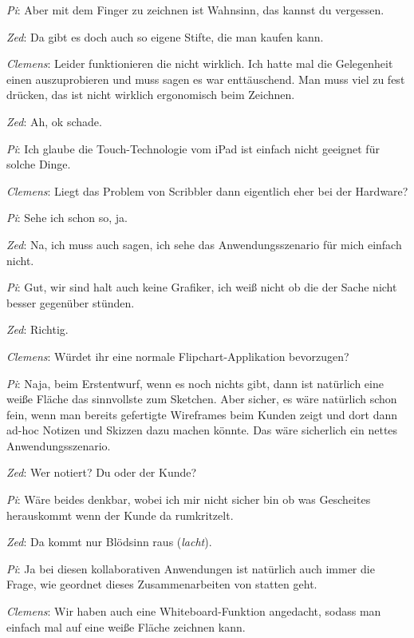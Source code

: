 \medskip \emph{Pi}: Aber mit dem Finger zu zeichnen ist Wahnsinn, das kannst du vergessen.

\medskip \emph{Zed}: Da gibt es doch auch so eigene Stifte, die man kaufen kann.

\medskip \emph{Clemens}: Leider funktionieren die nicht wirklich. Ich hatte mal die Gelegenheit einen auszuprobieren und muss sagen es war enttäuschend. Man muss viel zu fest drücken, das ist nicht wirklich ergonomisch beim Zeichnen.

\medskip \emph{Zed}: Ah, ok schade.

\medskip \emph{Pi}: Ich glaube die Touch-Technologie vom iPad ist einfach nicht geeignet für solche Dinge.

\medskip \emph{Clemens}: Liegt das Problem von Scribbler dann eigentlich eher bei der Hardware?

\medskip \emph{Pi}: Sehe ich schon so, ja.

\medskip \emph{Zed}: Na, ich muss auch sagen, ich sehe das Anwendungsszenario für mich einfach nicht.

\medskip \emph{Pi}: Gut, wir sind halt auch keine Grafiker, ich weiß nicht ob die der Sache nicht besser gegenüber stünden.

\medskip \emph{Zed}: Richtig.

\medskip \emph{Clemens}: Würdet ihr eine normale Flipchart-Applikation bevorzugen?

\medskip \emph{Pi}: Naja, beim Erstentwurf, wenn es noch nichts gibt, dann ist natürlich eine weiße Fläche das sinnvollste zum Sketchen. Aber sicher, es wäre natürlich schon fein, wenn man bereits gefertigte Wireframes beim Kunden zeigt und dort dann ad-hoc Notizen und Skizzen dazu machen könnte. Das wäre sicherlich ein nettes Anwendungsszenario.

\medskip \emph{Zed}: Wer notiert? Du oder der Kunde?

\medskip \emph{Pi}: Wäre beides denkbar, wobei ich mir nicht sicher bin ob was Gescheites herauskommt wenn der Kunde da rumkritzelt.

\medskip \emph{Zed}: Da kommt nur Blödsinn raus (\emph{lacht}).

\medskip \emph{Pi}: Ja bei diesen kollaborativen Anwendungen ist natürlich auch immer die Frage, wie geordnet dieses Zusammenarbeiten von statten geht. 

\medskip \emph{Clemens}: Wir haben auch eine Whiteboard-Funktion angedacht, sodass man einfach mal auf eine weiße Fläche zeichnen kann.

